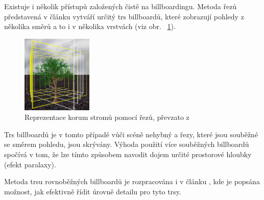 Existuje i několik přístupů založených čistě na billboardingu. Metoda řezů představená v článku \cite{Jakulin00} vytváří určitý trs billboardů, které zobrazují pohledy z několika směrů a to i v několika vrstvách (viz obr. ~\ref{fig:JAKULIN_slices}).
\begin{figure}[!htb]
\begin{center}
\includegraphics[width=0.3\textwidth]{./figures/slicingJakulin.jpg}
\end{center}
\caption{Reprezentace korum stromů pomocí řezů, převzato z \cite{Jakulin00} }
\label{fig:JAKULIN_slices}
\end{figure}
 Trs billboardů je v tomto případě vůči scéně nehybný a řezy, které jsou souběžné se směrem pohledu, jsou skrývány. Výhoda použití více souběžných billboardů spočívá v tom, že lze tímto způsobem navodit dojem určité prostorové hloubky (efekt paralaxy).

Metoda trsu rovnoběžných billboardů je rozpracována i v článku \cite{Truelsen_08}, kde je popsána možnost, jak efektivně řídit úrovně detailu pro tyto trsy.

